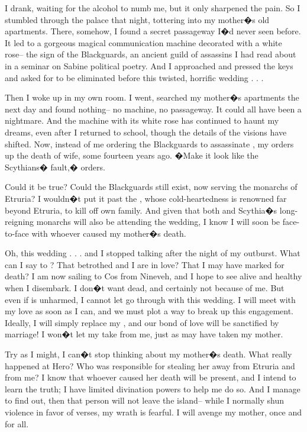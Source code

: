 \documentclass[char]{Kos}
\begin{document}
I drank, waiting for the alcohol to numb me, but it only sharpened the pain. So I stumbled through the palace that night, tottering into my mother�s old apartments. There, somehow, I found a secret passageway I�d never seen before. It led to a gorgeous magical communication machine decorated with a white rose-- the sign of the Blackguards, an ancient guild of assassins I had read about in a seminar on Sabine political poetry. And I approached and pressed the keys and asked for \cGroom{\nickname} to be eliminated before this twisted, horrific wedding . . .

Then I woke up in my own room. I went, searched my mother�s apartments the next day and found nothing-- no machine, no passageway. It could all have been a nightmare. And the machine with its white rose has continued to haunt my dreams, even after I returned to school, though the details of the visions have shifted. Now, instead of me ordering the Blackguards to assassinate \cGroom{\nickname}, my \cEtruriaKing{\parent} orders up the death of \cEtruriaKing{\their} wife, some fourteen years ago. �Make it look like the Scythians� fault,� \cEtruriaKing{\they} orders.

Could it be true? Could the Blackguards still exist, now serving the monarchs of Etruria? I wouldn�t put it past the \cEtruriaKing{\monarch}, whose cold-heartedness is renowned far beyond Etruria, to kill off \cEtruriaKing{\their} own family. And given that both \cEtruriaKing{\they} and Scythia�s long-reigning monarchs will also be attending the wedding, I know I will soon be face-to-face with whoever caused my mother�s death.

Oh, this wedding . . . \cGroom{\nickname} and I stopped talking after the night of my outburst. What can I say to \cGroom{\them}? That \cGroom{\their} betrothed and I are in love? That I may have marked \cGroom{\them} for death? I am now sailing to Cos from Nineveh, and I hope to see \cGroom{\them} alive and healthy when I disembark. I don�t want \cGroom{\them} dead, and certainly not because of me. But even if \cGroom{\they} is unharmed, I cannot let \cGroom{\them} go through with this wedding. I will meet with my love as soon as I can, and we must plot a way to break up this engagement. Ideally, I will simply replace my \cGroom{\sibling}, and our bond of love will be sanctified by marriage! I won�t let my \cEtruriaKing{\parent} take \cBride{\nickname} from me, just as \cEtruriaKing{\they} may have taken my mother. 

Try as I might, I can�t stop thinking about my mother�s death. What really happened at Hero? Who was responsible for stealing her away from Etruria and from me? I know that whoever caused her death will be present, and I intend to learn the truth; I have limited divination powers to help me do so. And I manage to find out, then that person will not leave the island-- while I normally shun violence in favor of verses, my wrath is fearful. I will avenge my mother, once and for all.
\end{document}
